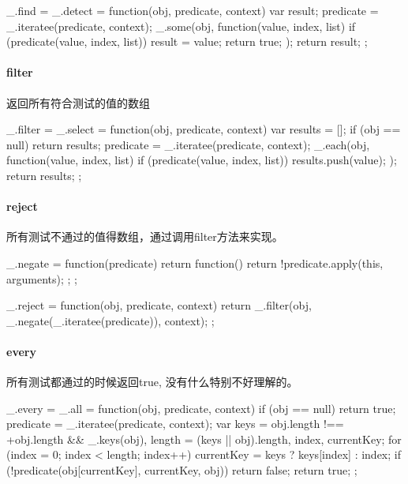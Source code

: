 \begin{JavaScript}

  _.find = _.detect = function(obj, predicate, context) {
    var result;
    predicate = _.iteratee(predicate, context);
    _.some(obj, function(value, index, list) {
      if (predicate(value, index, list)) {
        result = value;
        return true;
      }
    });
    return result;
  };
\end{JavaScript}


\paragraph{filter} 返回所有符合测试的值的数组

\begin{JavaScript}
  _.filter = _.select = function(obj, predicate, context) {
    var results = [];
    if (obj == null) return results;
    predicate = _.iteratee(predicate, context);
    _.each(obj, function(value, index, list) {
      if (predicate(value, index, list)) results.push(value);
    });
    return results;
  };
\end{JavaScript}

\paragraph{reject} 所有测试不通过的值得数组，通过调用filter方法来实现。

\begin{JavaScript}
  _.negate = function(predicate) {
    return function() {
      return !predicate.apply(this, arguments);
    };
  };
  
  _.reject = function(obj, predicate, context) {
    return _.filter(obj, _.negate(_.iteratee(predicate)), context);
  };
\end{JavaScript}

\paragraph{every} 所有测试都通过的时候返回true, 没有什么特别不好理解的。

\begin{JavaScript}
  _.every = _.all = function(obj, predicate, context) {
    if (obj == null) return true;
    predicate = _.iteratee(predicate, context);
    var keys = obj.length !== +obj.length && _.keys(obj),
        length = (keys || obj).length,
        index, currentKey;
    for (index = 0; index < length; index++) {
      currentKey = keys ? keys[index] : index;
      if (!predicate(obj[currentKey], currentKey, obj)) return false;
    }
    return true;
  };
\end{JavaScript}

